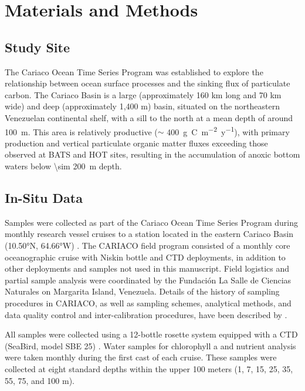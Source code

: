 \documentclass[draft]{agujournal2019}
\begin{document}
   


\section{Materials and Methods}
%
\subsection{Study Site}
    The Cariaco Ocean Time Series Program was established to explore the relationship between ocean surface processes and the sinking flux of particulate carbon. The Cariaco Basin is a large (approximately 160 km long and 70 km wide) and deep (approximately 1,400 m) basin, situated on the northeastern Venezuelan continental shelf, with a sill to the north at a mean depth of around \qty{100}{m}. This area is relatively productive ($\sim$ \qty{400}{g.C.m^{-2}.y^{-1}}), with primary production and vertical particulate organic matter fluxes exceeding those observed at BATS and HOT sites, resulting in the accumulation of anoxic bottom waters below \qty{\sim 200}{m} depth.

\subsection{In-Situ Data}
    Samples were collected as part of the Cariaco Ocean Time Series Program during monthly research vessel cruises to a station located in the eastern Cariaco Basin (\ang{10.50}N, \ang{64.66}W) \cite{muller-karger_scientific_2019}.
    The CARIACO field program consisted of a monthly core oceanographic cruise with Niskin bottle and CTD deployments, in addition to other deployments and samples not used in this manuscript. Field logistics and partial sample analysis were coordinated by the Fundación La Salle de Ciencias Naturales on Margarita Island, Venezuela. Details of the history of sampling procedures in CARIACO, as well as sampling schemes, analytical methods, and data quality control and inter-calibration procedures, have been described by . 
    
    All samples were collected using a 12-bottle rosette system equipped with a CTD (SeaBird, model SBE 25) \cite{astor_yrene_m_handbook_2013}. Water samples for chlorophyll a and nutrient analysis were taken monthly during the first cast of each cruise. These samples were collected at eight standard depths within the upper 100 meters (1, 7, 15, 25, 35, 55, 75, and 100 m). 
\end{document}
